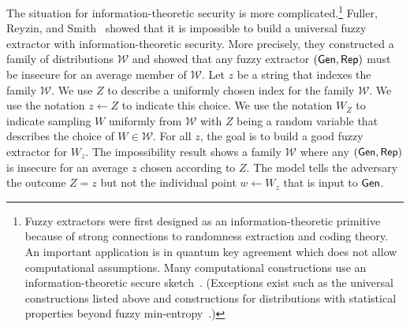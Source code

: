 The situation for information-theoretic security is more
complicated.\footnote{Fuzzy extractors were first designed as an
  information-theoretic primitive because of strong connections to
  randomness extraction and coding theory.  An important application is in quantum key agreement which does not allow computational assumptions.  Many computational
  constructions use an information-theoretic secure
  sketch~\cite{wen2018robustly,wen2019generic}.  (Exceptions exist
  such as the universal constructions listed above and constructions
  for distributions with statistical properties beyond fuzzy min-entropy~\cite{apon2017efficient,alamelou2018pseudoentropic,fuller2020computational,canetti2021reusable}.)
}  Fuller, Reyzin, and Smith~\cite{fuller2020fuzzy} showed that it is
impossible to build a universal fuzzy extractor with
information-theoretic security.  More precisely, they constructed a
family of distributions $\mathcal{W}$ and showed that any
fuzzy extractor $({\mathsf{Gen}}, {\mathsf{Rep}})$ must be insecure for an average member
of $\mathcal{W}$. Let $z$ be a string that indexes the family $\mathcal{W}$. We use $Z$ to describe a uniformly chosen index for
the family $\mathcal{W}$.  We use the notation $z\leftarrow Z$ to indicate this choice. We use the notation $W_Z$ to indicate sampling $W$ uniformly from $\mathcal{W}$ with $Z$ being a random variable that describes the choice of $W\in\mathcal{W}$. For all $z$, the goal is to build a good fuzzy extractor for $W_z$.  The impossibility result shows a family $\mathcal{W}$ where any $({\mathsf{Gen}}, {\mathsf{Rep}})$ is insecure for an average $z$ chosen according to $Z$.  The model tells the adversary the outcome $Z=z$ but not the
individual point $w\leftarrow W_z$ that is input to ${\mathsf{Gen}}$.

